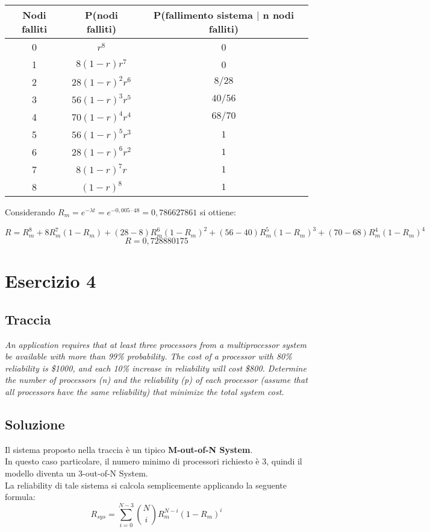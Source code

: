\begin{tabular}{c||c|c|}

\textbf{Nodi falliti}& \textbf{P(nodi falliti)} & \textbf{P(fallimento sistema $\mid$ n nodi falliti)}\\
\hline
\hline
0 & $r^8$ & 0 \\
\hline
1 & $8(1-r)r^7$ & 0 \\
\hline
2 & $28(1-r)^2r^6$ & $8/28$ \\
\hline
3 & $56(1-r)^3r^5$ & $40/56$ \\
\hline
4 & $70(1-r)^4r^4$ & $68/70$ \\
\hline
5 & $56(1-r)^5r^3$ & $1$ \\
\hline
6 & $28(1-r)^6r^2$ & $1$ \\
\hline
7 & $8(1-r)^7r$ & $1$ \\
\hline
8 & $(1-r)^8$ & $1$ \\
\hline
\end{tabular}

\clearpage

Considerando $R_m=e^{-\lambda t}=e^{-0,005\cdot 48}=0,786627861$ si ottiene:

$$R=R_m^8+8R_m^7(1-R_m)+(28-8)R_m^6(1-R_m)^2+(56-40)R_m^5(1-R_m)^3+(70-68)R_m^4(1-R_m)^4$$
$$R=0,728880175$$

\clearpage
\section{Esercizio 4}
\subsection{Traccia}
\textit{An application requires that at least three processors from a multiprocessor
system be available with more than 99\% probability. The cost of a processor with
80\% reliability is \$1000, and each 10\% increase in reliability will cost \$800.
Determine the number of processors (n) and the reliability (p) of each processor
(assume that all processors have the same reliability) that minimize the total
system cost.}

\clearpage
\subsection{Soluzione}
Il sistema proposto nella traccia è un tipico \textbf{M-out-of-N System}.\\
In questo caso particolare, il numero minimo di processori richiesto è 3, quindi
il modello diventa un 3-out-of-N System.\\
La reliability di tale sistema si calcola semplicemente applicando la seguente
formula:
$$R_{sys} = \sum_{i=0}^{N-3} \binom{N}{i} R_m^{N-i}(1-R_m)^i$$
\vspace{0.4cm}

